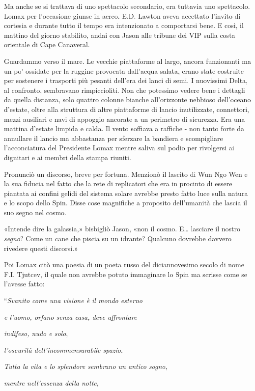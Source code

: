 Ma anche se si trattava di uno spettacolo secondario, era tuttavia uno
spettacolo. Lomax per l'occasione giunse in aereo. E.D. Lawton aveva
accettato l'invito di cortesia e durante tutto il tempo era intenzionato
a comportarsi bene. E così, il mattino del giorno stabilito, andai con
Jason alle tribune dei VIP sulla costa orientale di Cape Canaveral.

Guardammo verso il mare. Le vecchie piattaforme al largo, ancora
funzionanti ma un po' ossidate per la ruggine provocata dall'acqua
salata, erano state costruite per sostenere i trasporti più pesanti
dell'era dei lanci di semi. I nuovissimi Delta, al confronto, sembravano
rimpiccioliti. Non che potessimo vedere bene i dettagli da quella
distanza, solo quattro colonne bianche all'orizzonte nebbioso
dell'oceano d'estate, oltre alla struttura di altre piattaforme di
lancio inutilizzate, connettori, mezzi ausiliari e navi di appoggio
ancorate a un perimetro di sicurezza. Era una mattina d'estate limpida e
calda. Il vento soffiava a raffiche - non tanto forte da annullare il
lancio ma abbastanza per sferzare la bandiera e scompigliare
l'acconciatura del Presidente Lomax mentre saliva sul podio per
rivolgersi ai dignitari e ai membri della stampa riuniti.

Pronunciò un discorso, breve per fortuna. Menzionò il lascito di Wun Ngo
Wen e la sua fiducia nel fatto che la rete di replicatori che era in
procinto di essere piantata ai confini gelidi del sistema solare avrebbe
presto fatto luce sulla natura e lo scopo dello Spin. Disse cose
magnifiche a proposito dell'umanità che lascia il suo segno nel cosmo.

«Intende dire la galassia,» bisbigliò Jason, «non il cosmo. E\ldots{}
lasciare il nostro \emph{segno}? Come un cane che piscia su un idrante?
Qualcuno dovrebbe davvero rivedere questi discorsi.»

Poi Lomax citò una poesia di un poeta russo del diciannovesimo secolo di
nome F.I. Tjutcev, il quale non avrebbe potuto immaginare lo Spin ma
scrisse come se l'avesse fatto:

``\emph{Svanito come una visione è il mondo esterno}

\emph{e l'uomo, orfano senza casa, deve affrontare}

\emph{indifeso, nudo e solo},

\emph{l'oscurità dell'incommensurabile spazio}.

\emph{Tutta la vita e lo splendore sembrano un antico sogno},

\emph{mentre nell'essenza della notte},

